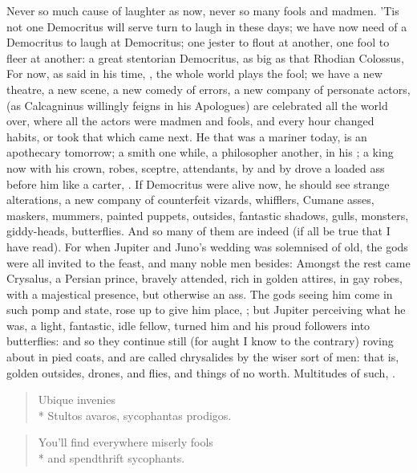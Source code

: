 {Never so much cause of laughter as now, never so many fools and madmen.
'Tis not one Democritus will serve turn to laugh in these days; we
have now need of a Democritus to laugh at Democritus; one jester to
flout at another, one fool to fleer at another: a great stentorian
Democritus, as big as that Rhodian Colossus, For now, as
 said in his time, , the
whole world plays the fool; we have a new theatre, a new scene, a new
comedy of errors, a new company of personate actors,  (as
Calcagninus willingly feigns in his Apologues) are celebrated all the
world over, where all the actors were madmen and fools, and every
hour changed habits, or took that which came next. He that was a
mariner today, is an apothecary tomorrow; a smith one while, a
philosopher another, in his ; a king now with his crown,
robes, sceptre, attendants, by and by drove a loaded ass before him
like a carter, \etc{}. If Democritus were alive now, he should see strange
alterations, a new company of counterfeit vizards, whifflers, Cumane
asses, maskers, mummers, painted puppets, outsides, fantastic shadows,
gulls, monsters, giddy-heads, butterflies. And so many of them are
indeed (if all be true that I have read). For when Jupiter and
Juno's wedding was solemnised of old, the gods were all invited to the
feast, and many noble men besides: Amongst the rest came Crysalus, a
Persian prince, bravely attended, rich in golden attires, in gay robes,
with a majestical presence, but otherwise an ass. The gods seeing him
come in such pomp and state, rose up to give him place, ; but Jupiter perceiving what he was, a light,
fantastic, idle fellow, turned him and his proud followers into
butterflies: and so they continue still (for aught I know to the
contrary) roving about in pied coats, and are called chrysalides by the
wiser sort of men: that is, golden outsides, drones, and flies, and
things of no worth. Multitudes of such, \etc{}.
\begin{latin}
%
\settowidth{\versewidth}{Stultos avaros, sycophantas prodigos.}
\begin{verse}
\hspace{0.5\versewidth}Ubique invenies\\*
Stultos avaros, sycophantas prodigos.%
\end{verse}
\end{latin}
\translationrule
{}
\begin{verse}
You'll find everywhere miserly fools\\*
and spendthrift sycophants.\\
\end{verse}

}
